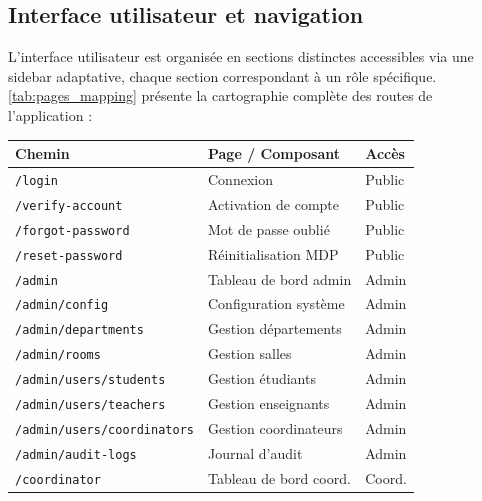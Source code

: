 \subsection{Interface utilisateur et navigation}
\label{ch4:interface}

L'interface utilisateur est organisée en sections distinctes accessibles via une sidebar adaptative, chaque section correspondant à un rôle spécifique. \cref{tab:pages_mapping} présente la cartographie complète des routes de l'application :

\begin{table}[H]
    \centering
    \small
    \begin{xltabular}{\textwidth}{lXX}
        \toprule

        \textbf{Chemin}                        & \textbf{Page / Composant} & \textbf{Accès} \\
        \midrule
        \texttt{/login}                        & Connexion                 & Public         \\
        \texttt{/verify-account}               & Activation de compte      & Public         \\
        \texttt{/forgot-password}              & Mot de passe oublié       & Public         \\
        \texttt{/reset-password}               & Réinitialisation MDP      & Public         \\
        \midrule
        \texttt{/admin}                        & Tableau de bord admin     & Admin          \\
        \texttt{/admin/config}                 & Configuration système     & Admin          \\
        \texttt{/admin/departments}            & Gestion départements      & Admin          \\
        \texttt{/admin/rooms}                  & Gestion salles            & Admin          \\
        \texttt{/admin/users/students}         & Gestion étudiants         & Admin          \\
        \texttt{/admin/users/teachers}         & Gestion enseignants       & Admin          \\
        \texttt{/admin/users/coordinators}     & Gestion coordinateurs     & Admin          \\
        \texttt{/admin/audit-logs}             & Journal d'audit           & Admin          \\
        \midrule
        \texttt{/coordinator}                  & Tableau de bord coord.    & Coord.         \\

\end{xltabular}
\end{table}
